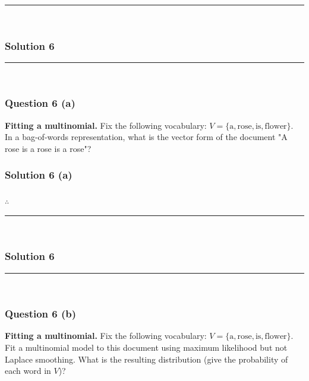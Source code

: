 \documentclass{article}
\begin{document}
\noindent\rule{\textwidth}{0.4pt}\\

\newpage



\subsubsection*{Solution 6}
\noindent\rule{\textwidth}{0.4pt}\\
\subsubsection*{Question 6 (a)}
\begin{flushleft}
    \textbf{Fitting a multinomial.} Fix the following vocabulary: $V=\{\mathrm{a}, \mathrm{rose}, \mathrm{is}, \mathrm{flower}\}$.\\
    In a bag-of-words representation, what is the vector form of the document "A rose is a rose is a rose"?
\end{flushleft}

\subsubsection*{Solution 6 (a)}


\subsubsection*{\normalfont}{$\therefore$ } \\

\noindent\rule{\textwidth}{0.4pt}\\

\newpage

\subsubsection*{Solution 6}
\noindent\rule{\textwidth}{0.4pt}\\
\subsubsection*{Question 6 (b)}
\begin{flushleft}
    \textbf{Fitting a multinomial.} Fix the following vocabulary: $V=\{\mathrm{a}, \mathrm{rose}, \mathrm{is}, \mathrm{flower}\}$.\\
    Fit a multinomial model to this document using maximum likelihood but not Laplace smoothing. What is the resulting distribution (give the probability of each word in $V$)?
\end{flushleft}
\end{document}
